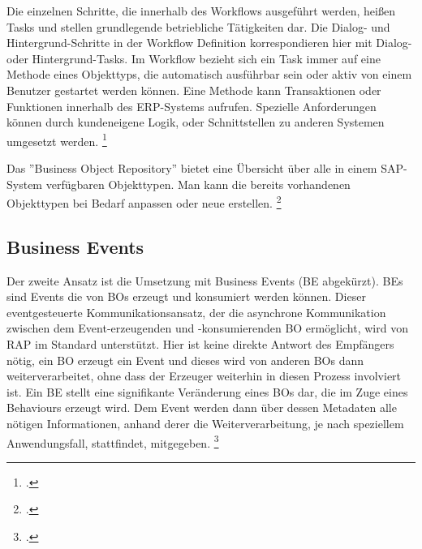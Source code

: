 Die einzelnen Schritte, die innerhalb des Workflows ausgeführt werden, hei{\ss}en Tasks und stellen grundlegende betriebliche Tätigkeiten dar. Die Dialog- und Hintergrund-Schritte in der Workflow Definition korrespondieren hier mit Dialog- oder Hintergrund-Tasks. Im Workflow bezieht sich ein Task immer auf eine Methode eines Objekttyps, die automatisch ausführbar sein oder aktiv von einem Benutzer gestartet werden können. Eine Methode kann Transaktionen oder Funktionen innerhalb des ERP-Systems aufrufen. Spezielle Anforderungen können durch kundeneigene Logik, oder Schnittstellen zu anderen Systemen umgesetzt werden. \footcite[Vgl.][]{sap_business-workflows_2022-1}

Das ''Business Object Repository'' bietet eine Übersicht über alle in einem SAP-System verfügbaren Objekttypen. Man kann die bereits vorhandenen Objekttypen bei Bedarf anpassen oder neue erstellen. \footcite[Vgl.][]{sap_business-workflows_2022-1}

\subsection{Business Events}

Der zweite Ansatz ist die Umsetzung mit Business Events (BE abgekürzt). BEs sind Events die von BOs erzeugt und konsumiert werden können. Dieser eventgesteuerte Kommunikationsansatz, der die asynchrone Kommunikation zwischen dem Event-erzeugenden und -konsumierenden BO ermöglicht, wird von RAP im Standard unterstützt. Hier ist keine direkte Antwort des Empfängers nötig, ein BO erzeugt ein Event und dieses wird von anderen BOs dann weiterverarbeitet, ohne dass der Erzeuger weiterhin in diesen Prozess involviert ist. 
Ein BE stellt eine signifikante Veränderung eines BOs dar, die im Zuge eines Behaviours erzeugt wird. Dem Event werden dann über dessen Metadaten alle nötigen Informationen, anhand derer die Weiterverarbeitung, je nach speziellem Anwendungsfall, stattfindet, mitgegeben. \footcite[Vgl.][]{sap_business-events_2023}


